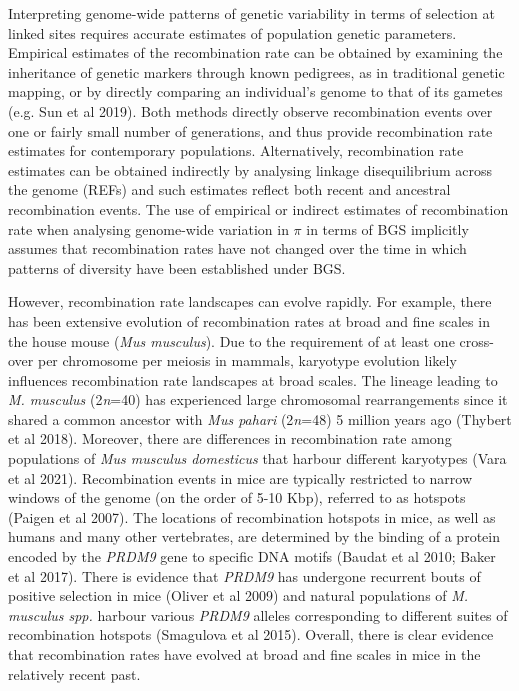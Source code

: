 \documentclass[10pt,twoside, twocolumn]{GSA_format}
\begin{document}
\vspace{5px}

Interpreting genome-wide patterns of genetic variability in terms of selection at linked sites requires accurate estimates of population genetic parameters. Empirical estimates of the recombination rate can be obtained by examining the inheritance of genetic markers through known pedigrees, as in traditional genetic mapping, or by directly comparing an individual's genome to that of its gametes (e.g. Sun et al 2019). Both methods directly observe recombination events over one or fairly small number of generations, and thus provide recombination rate estimates for contemporary populations. Alternatively, recombination rate estimates can be obtained indirectly by analysing linkage disequilibrium across the genome (REFs) and such estimates reflect both recent and ancestral recombination events. The use of empirical or indirect estimates of recombination rate when analysing genome-wide variation in $\pi$ in terms of BGS implicitly assumes that recombination rates have not changed over the time in which patterns of diversity have been established under BGS.

\vspace{5px}

However, recombination rate landscapes can evolve rapidly. For example, there has been extensive evolution of recombination rates at broad and fine scales in the house mouse (\textit{Mus musculus}). Due to the requirement of at least one cross-over per chromosome per meiosis in mammals, karyotype evolution likely influences recombination rate landscapes at broad scales. The lineage leading to \textit{M. musculus}  (2\textit{n}=40) has experienced large chromosomal rearrangements since it shared a common ancestor with \textit{Mus pahari} (2\textit{n}=48) 5 million years ago (Thybert et al 2018). Moreover, there are differences in recombination rate among populations of \textit{Mus musculus domesticus} that harbour different karyotypes (Vara et al 2021). Recombination events in mice are typically restricted to narrow windows of the genome (on the order of 5-10 Kbp), referred to as hotspots (Paigen et al 2007). The locations of recombination hotspots in mice, as well as humans and many other vertebrates, are determined by the binding of a protein encoded by the \textit{PRDM9} gene to specific DNA motifs (Baudat et al 2010; Baker et al 2017). There is evidence that \textit{PRDM9} has undergone recurrent bouts of positive selection in mice (Oliver et al 2009) and natural populations of \textit{M. musculus spp.} harbour various \textit{PRDM9} alleles corresponding to different suites of recombination hotspots  (Smagulova et al 2015). Overall, there is clear evidence that recombination rates have evolved at broad and fine scales in mice in the relatively recent past. 
\end{document}
